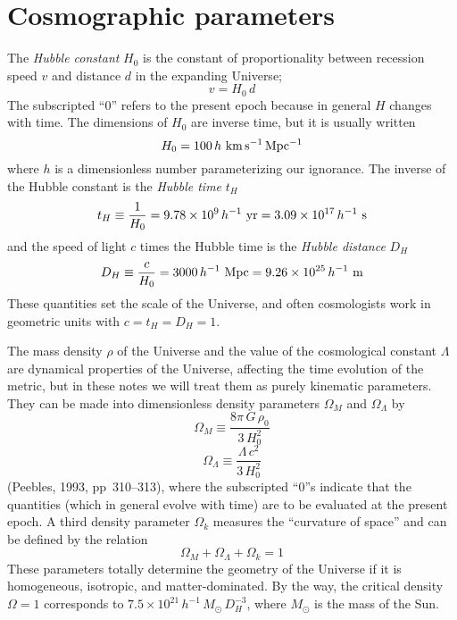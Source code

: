 \section{Cosmographic parameters}

The {\em Hubble constant\/} $H_0$ is the constant of proportionality
between recession speed $v$ and distance $d$ in the expanding
Universe;
\begin{equation}
v=H_0\, d
\end{equation}
The subscripted ``0'' refers to the present epoch because in general
$H$ changes with time.  The dimensions of $H_0$ are inverse time, but
it is usually written
\begin{equation}
H_0=100\,h~{\rm km\,s^{-1}\,Mpc^{-1}}
\end{equation}
where $h$ is a dimensionless number parameterizing our ignorance.  The
inverse of the Hubble constant is the {\em Hubble time\/} $t_H$
\begin{equation}
t_H\equiv\frac{1}{H_0}
= 9.78\times10^9\,h^{-1}~{\rm yr}= 3.09\times10^{17}\,h^{-1}~{\rm s}
\end{equation}
and the speed of light $c$ times the Hubble time is the {\em Hubble
distance\/} $D_H$
\begin{equation}
D_H\equiv\frac{c}{H_0}
= 3000\,h^{-1}~{\rm Mpc}= 9.26\times10^{25}\,h^{-1}~{\rm m}
\end{equation}
These quantities set the scale of the Universe, and often cosmologists
work in geometric units with $c=t_H=D_H=1$.

The mass density $\rho$ of the Universe and the value of the
cosmological constant $\Lambda$ are dynamical properties of the
Universe, affecting the time evolution of the metric, but in these
notes we will treat them as purely kinematic parameters.  They can be
made into dimensionless density parameters $\Omega_M$ and
$\Omega_{\Lambda}$ by
\begin{equation}
\Omega_M\equiv\frac{8\pi\,G\,\rho_0}{3\,H_0^2}
\end{equation}
\begin{equation}
\Omega_{\Lambda}\equiv\frac{\Lambda\,c^2}{3\,H_0^2}
\end{equation}
(Peebles, 1993, pp~310--313), where the subscripted ``0''s indicate
that the quantities (which in general evolve with time) are to be
evaluated at the present epoch.  A third density parameter $\Omega_k$
measures the ``curvature of space'' and can be defined by the relation
\begin{equation}
\Omega_M+\Omega_{\Lambda}+\Omega_k= 1
\end{equation}
These parameters totally determine the geometry of the Universe if it
is homogeneous, isotropic, and matter-dominated.  By the way, the
critical density $\Omega=1$ corresponds to $7.5\times
10^{21}\,h^{-1}\,M_{\odot}\,D_H^{-3}$, where $M_{\odot}$ is the mass
of the Sun.

